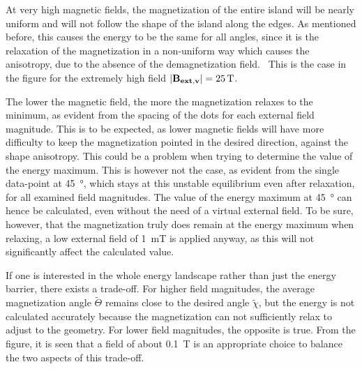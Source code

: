 \documentclass[11pt,a4paper,english]{article}
\begin{document}
At very high magnetic fields, the magnetization of the entire island will be nearly uniform and will not follow the shape of the island along the edges. As mentioned before, this causes the energy to be the same for all angles, since it is the relaxation of the magnetization in a non-uniform way which causes the anisotropy, due to the absence of the demagnetization field.~\cite{Nonmonotonic_reversal} This is the case in the figure for the extremely high field $\abs{\vb{B_{ext,v}}}=\SI{25}{\tesla}$. \par
The lower the magnetic field, the more the magnetization relaxes to the minimum, as evident from the spacing of the dots for each external field magnitude. This is to be expected, as lower magnetic fields will have more difficulty to keep the magnetization pointed in the desired direction, against the shape anisotropy. This could be a problem when trying to determine the value of the energy maximum. This is however not the case, as evident from the single data-point at \SI{45}{\degree}, which stays at this unstable equilibrium even after relaxation, for all examined field magnitudes. The value of the energy maximum at \SI{45}{\degree} can hence be calculated, even without the need of a virtual external field. To be sure, however, that the magnetization truly does remain at the energy maximum when relaxing, a low external field of \SI{1}{\milli\tesla} is applied anyway, as this will not significantly affect the calculated value. \par
If one is interested in the whole energy landscape rather than just the energy barrier, there exists a trade-off. For higher field magnitudes, the average magnetization angle $\widetilde{\Theta}$ remains close to the desired angle $\widetilde{\chi}$, but the energy is not calculated accurately because the magnetization can not sufficiently relax to adjust to the geometry. For lower field magnitudes, the opposite is true. From the figure, it is seen that a field of about \SI{0.1}{\tesla} is an appropriate choice to balance the two aspects of this trade-off. \par
\end{document}
